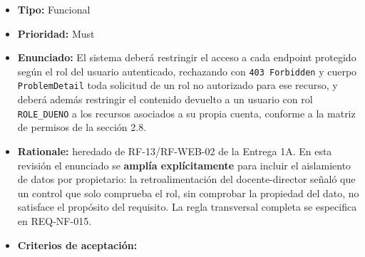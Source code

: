 \documentclass[
  spanish,
]{article}
\providecommand{\tightlist}{%
  \setlength{\itemsep}{0pt}\setlength{\parskip}{0pt}}
\begin{document}
\begin{itemize}
\tightlist
\item
  \textbf{Tipo:} Funcional
\item
  \textbf{Prioridad:} Must
\item
  \textbf{Enunciado:} El sistema deberá restringir el acceso a cada
  endpoint protegido según el rol del usuario autenticado, rechazando
  con \texttt{403\ Forbidden} y cuerpo \texttt{Problem\allowbreak{}Detail} toda
  solicitud de un rol no autorizado para ese recurso, y deberá además
  restringir el contenido devuelto a un usuario con rol
  \texttt{ROLE\_\allowbreak{}DUENO} a los recursos asociados a su propia cuenta,
  conforme a la matriz de permisos de la sección 2.8.
\item
  \textbf{Rationale:} heredado de RF-13/RF-WEB-02 de la Entrega 1A. En
  esta revisión el enunciado se \textbf{amplía explícitamente} para
  incluir el aislamiento de datos por propietario: la retroalimentación
  del docente-director señaló que un control que solo comprueba el rol,
  sin comprobar la propiedad del dato, no satisface el propósito del
  requisito. La regla transversal completa se especifica en REQ-NF-015.
\item
  \textbf{Criterios de aceptación:}


\end{itemize}
\end{document}
